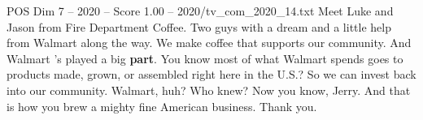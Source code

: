 \begin{textsample}{POS Dim 7 – 2020 – Score 1.00 – 2020/tv\_com\_2020\_14.txt}  \label{ex:f7_pos_085}
Meet Luke and Jason from Fire Department Coffee.
Two guys with a dream and a little help from Walmart along the way.
We make coffee that supports our community.
And Walmart 's played a big \textbf{part}.
You know most of what Walmart spends goes to products made, grown, or assembled right here in the U.S.?
So we can invest back into our community.
Walmart, huh?
Who knew?
Now you know, Jerry.
And that is how you brew a mighty fine American business.
Thank you.

\end{textsample}
